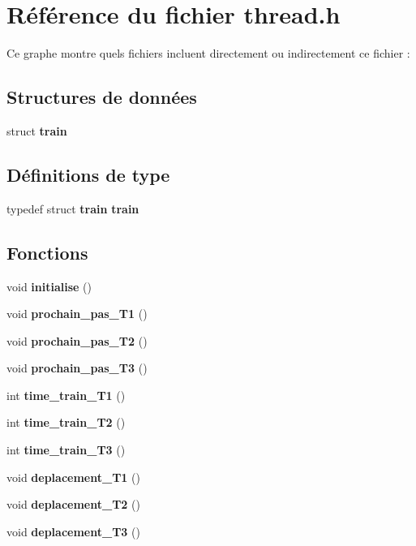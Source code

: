 \section{Référence du fichier thread.\+h}
\label{thread_8h}
Ce graphe montre quels fichiers incluent directement ou indirectement ce fichier \+:
\subsection*{Structures de données}
\begin{DoxyCompactItemize}
\item 
struct {\bf train}
\end{DoxyCompactItemize}
\subsection*{Définitions de type}
\begin{DoxyCompactItemize}
\item 
typedef struct {\bf train} {\bf train}
\end{DoxyCompactItemize}
\subsection*{Fonctions}
\begin{DoxyCompactItemize}
\item 
void {\bf initialise} ()
\item 
void {\bf prochain\+\_\+pas\+\_\+\+T1} ()
\item 
void {\bf prochain\+\_\+pas\+\_\+\+T2} ()
\item 
void {\bf prochain\+\_\+pas\+\_\+\+T3} ()
\item 
int {\bf time\+\_\+train\+\_\+\+T1} ()
\item 
int {\bf time\+\_\+train\+\_\+\+T2} ()
\item 
int {\bf time\+\_\+train\+\_\+\+T3} ()
\item 
void {\bf deplacement\+\_\+\+T1} ()
\item 
void {\bf deplacement\+\_\+\+T2} ()
\item 
void {\bf deplacement\+\_\+\+T3} ()
\end{DoxyCompactItemize}
